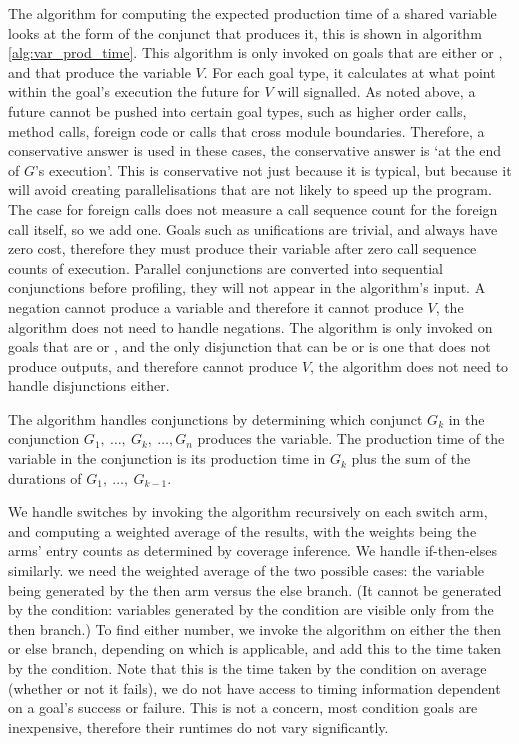 The algorithm for computing the expected production time
of a shared variable looks at the form of the conjunct that produces it,
this is shown in algorithm \ref{alg:var_prod_time}.
This algorithm is only invoked on goals that are either \ddet or \dccmulti,
and that produce the variable $V$.
For each goal type,
it calculates at what point within the goal's execution
the future for $V$ will signalled.
As noted above,
a future cannot be pushed into certain goal types,
such as higher order calls, method calls,
foreign code or calls that cross module boundaries.
Therefore, a conservative answer is used in these cases,
the conservative answer is `at the end of $G$'s execution'.
This is conservative not just because it is typical,
but because it will avoid creating parallelisations that are not likely
to speed up the program.
The case for foreign calls does not measure a call sequence count for the
foreign call itself, so we add one.
Goals such as unifications are trivial, and always have zero cost,
therefore they must produce their variable after zero call sequence counts
of execution.
Parallel conjunctions are converted into sequential conjunctions before
profiling,
they will not appear in the algorithm's input.
A negation cannot produce a variable and therefore it cannot produce $V$,
the algorithm does not need to handle negations.
The algorithm is only invoked on goals that are \ddet or \dccmulti,
and the only disjunction that can be \ddet or \dccmulti is one that does not
produce outputs,
and therefore cannot produce $V$,
the algorithm does not need to handle disjunctions either.

The algorithm handles conjunctions by determining which conjunct
$G_k$ in the conjunction $G_1,~\ldots,~G_k,~\ldots,G_n$ produces the
variable.
The production time of the variable in the conjunction is its production
time in $G_k$ plus the sum of the durations of $G_1,~\ldots,~G_{k-1}$.

We handle switches by invoking the algorithm recursively on each switch
arm,
and computing a weighted average of the results,
with the weights being the arms' entry counts as determined by coverage
inference.
We handle if-then-elses similarly.
we need the weighted average of the two possible cases:
the variable being generated by the then arm versus the else branch.
(It cannot be generated by the condition:
variables generated by the condition are visible only from the then branch.)
To find either number,
we invoke the algorithm on either the then or else branch,
depending on which is applicable,
and add this to the time taken by the condition.
Note that this is the time taken by the condition on average
(whether or not it fails),
we do not have access to timing information dependent on a goal's success or
failure.
This is not a concern, most condition goals are inexpensive,
therefore their runtimes do not vary significantly.


